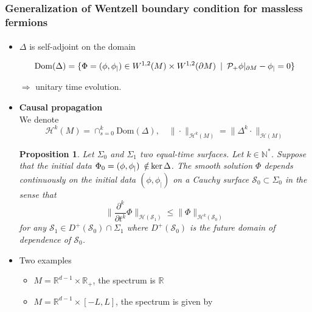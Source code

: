 \documentclass[english]{beamer}
\newcommand{\dom}{\mathrm{Dom}}
\newtheorem{proposition}{Proposition}
\begin{document}
\begin{frame}[shrink=30]
\frametitle{\small{Generalization of Wentzell boundary condition for massless fermions}}
\framesubtitle{}

\begin{itemize}

\item<1-> $\Delta$ is self-adjoint on the domain

\begin{equation*}
\dom( \Delta) = \{ \Phi = (\phi, \phi_|) \in W^{1,2}(M)\times W^{1,2}(
\partial M) \enskip | \enskip \mathcal{P}_+\phi \vert_{\partial M} - \phi_| = 0 \} 
\end{equation*}  

$\Rightarrow$ unitary time evolution.
\newline

\item<2-> \textbf{Causal propagation}\\
We denote
\begin{equation*}
\mathcal{H}^k(M) = \cap_{s=0}^{k} \dom(\Delta), 
\quad
\| \cdot \|_{\mathcal{H}^k(M)} = \| \Delta^k \cdot \|_{\mathcal{H}(M)}
\end{equation*}

\begin{proposition}
Let $\Sigma_0$ and $\Sigma_1$ two equal-time surfaces.
Let $k \in \mathbb{N}^*$.
Suppose that the initial data $\Phi_0 = (\phi, \phi_|)\enskip\slashed{\in} \ker \Delta$.
The smooth solution $\Phi$ depends continuously on the initial data $(\phi, \phi_|)$ on a Cauchy surface $\mathcal{S}_0 \subset \Sigma_0$ in the sense that
\begin{equation*}
\big\| \frac{\partial^k}{\partial t^k} \Phi\big\|_{\mathcal{H}(\mathcal{S}_1)}
\leq
\big\| \Phi\big\|_{\mathcal{H}^{k}(\mathcal{S}_0)}
\end{equation*}
for any $\mathcal{S}_1 \in D^+(\mathcal{S}_0)\cap\Sigma_1$
where $D^+(\mathcal{S}_0)$ is the future domain of dependence of $\mathcal{S}_0$.
\end{proposition}

\item<3-> Two examples 

	\begin{itemize}
		\item<4-> $M = \mathbb{R}^{d-1}\times \mathbb{R}_+$, the spectrum is $\mathbb{R}$
		\item<5-> $M = \mathbb{R}^{d-1}\times [-L, L]$, the spectrum is given by
	\end{itemize}
\end{itemize}

\end{frame}
\end{document}
